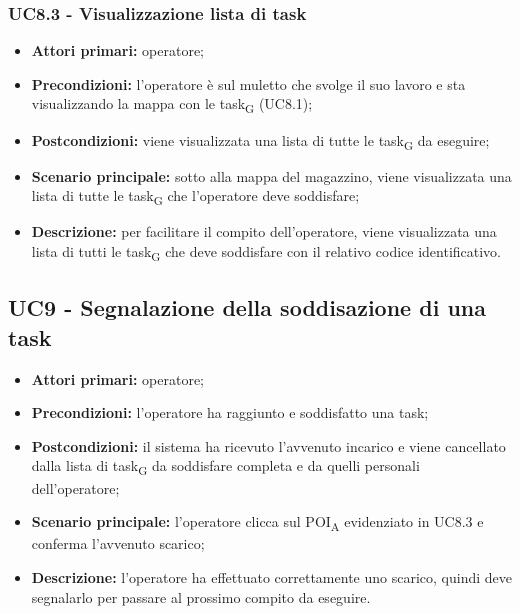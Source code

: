 \subsubsection{UC8.3 - Visualizzazione lista di task}
\begin{itemize}
	\item 	\textbf{Attori primari:} operatore;
	\item 	\textbf{Precondizioni:} l’operatore è sul muletto che svolge il suo lavoro e sta visualizzando la mappa con le \gls{task}\textsubscript{G} (UC8.1);
	\item 	\textbf{Postcondizioni:} viene visualizzata una lista di tutte le \gls{task}\textsubscript{G} da eseguire;
	\item 	\textbf{Scenario principale:} sotto alla mappa del magazzino, viene visualizzata una lista di tutte le \gls{task}\textsubscript{G} che l’operatore deve soddisfare;
	\item 	\textbf{Descrizione:} per facilitare il compito dell’operatore, viene visualizzata una lista di tutti le \gls{task}\textsubscript{G} che deve soddisfare con il relativo codice identificativo.
\end{itemize}

\subsection{UC9 - Segnalazione della soddisazione di una task}
\begin{itemize}
	\item 	\textbf{Attori primari:} operatore;
	\item 	\textbf{Precondizioni:} l’operatore ha raggiunto e soddisfatto una task;
	\item 	\textbf{Postcondizioni:} il sistema ha ricevuto l’avvenuto incarico e viene cancellato dalla lista di \gls{task}\textsubscript{G} da soddisfare completa e da quelli personali dell’operatore;
	\item 	\textbf{Scenario principale:} l’operatore clicca sul \acrshort{POI}\textsubscript{A} evidenziato in UC8.3 e conferma l’avvenuto scarico;
	\item 	\textbf{Descrizione:} l’operatore ha effettuato correttamente uno scarico, quindi deve segnalarlo per passare al prossimo compito da eseguire.

\end{itemize}


